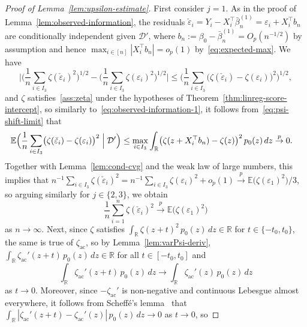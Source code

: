 \documentclass[a4paper]{article}
\newcommand{\R}{\mathbb{R}}
\newcommand{\E}{\mathbb{E}}
\newcommand{\cvp}{\overset{p}{\to}}
\theoremstyle{definition}
\begin{document}
\begin{proof}[Proof of Lemma~\ref{lem:upsilon-estimate}]
First consider $j = 1$. As in the proof of Lemma~\ref{lem:observed-information}, the residuals $\check{\varepsilon}_i = Y_i - X_i^\top\bar{\beta}_n^{(1)} = \varepsilon_i + X_i^\top b_n$ are conditionally independent given $\mathcal{D}'$, where $b_n := \beta_0 - \bar{\beta}_n^{(1)} = O_p(n^{-1/2})$ by assumption and hence $\max_{i \in [n]} |X_i^\top b_n| = o_p(1)$ by~\eqref{eq:expected-max}. We have
\[
\biggl|\biggl(\frac{1}{n}\sum_{i \in I_3} \zeta(\check{\varepsilon}_i)^2\biggr)^{1/2} - \biggl(\frac{1}{n}\sum_{i \in I_3} \zeta(\varepsilon_i)^2\biggr)^{1/2}\biggr| \leq \biggl(\frac{1}{n}\sum_{i \in I_3} \bigl(\zeta(\check{\varepsilon}_i) - \zeta(\varepsilon_i)\bigr)^2\biggr)^{1/2},
\]
and $\zeta$ satisfies~\ref{ass:zeta} under the hypotheses of Theorem~\ref{thm:linreg-score-intercept}, so similarly to~\eqref{eq:observed-information-1}, it follows from~\eqref{eq:psi-shift-limit} that
\begin{align*}
\E\Bigl(\frac{1}{n}\sum_{i \in I_3} \bigl(\zeta(\check{\varepsilon}_i) - \zeta(\varepsilon_i)\bigr)^2 \Bigm| \mathcal{D}'\Bigr) &\leq \max_{i \in I_3} \int_\R\bigl(\zeta(z + X_i^\top b_n) - \zeta(z)\bigr)^2\,p_0(z)\,dz \cvp 0.
\end{align*}
Together with Lemma~\ref{lem:cond-cvg} and the weak law of large numbers, this implies that $n^{-1}\sum_{i \in I_3} \zeta(\check{\varepsilon}_i)^2 = n^{-1}\sum_{i \in I_3} \zeta(\varepsilon_i)^2 + o_p(1) \cvp \E\bigl(\zeta(\varepsilon_1)^2\bigr)/3$, so arguing similarly for $j \in \{2,3\}$, we obtain
\begin{equation}
\label{eq:zeta-squared-avg}
\frac{1}{n}\sum_{i=1}^n \zeta(\check{\varepsilon}_i)^2 \cvp \E\bigl(\zeta(\varepsilon_1)^2\bigr)
\end{equation}
as $n \to \infty$. Next, since $\zeta$ satisfies $\int_\R \zeta(z + t)^2\,p_0(z)\,dz \in \R$ for $t \in \{-t_0,t_0\}$, the same is true of $\zeta_{\mathrm{ac}}$, so by Lemma~\ref{lem:varPsi-deriv}, $\int_\R \zeta_{\mathrm{ac}}'(z + t)\,p_0(z)\,dz \in \R$ for all $t \in [-t_0,t_0]$ and
\[
\int_\R \zeta_{\mathrm{ac}}'(z + t)\,p_0(z)\,dz 
\to \int_\R \zeta_{\mathrm{ac}}'(z)\,p_0(z)\,dz
\]
as $t \to 0$. Moreover, since $-\zeta_{\mathrm{ac}}'$ is non-negative and continuous Lebesgue almost everywhere, it follows from Scheff\'e's lemma~\citep[e.g.][Lemma~2.29]{vdV1998asymptotic} that $\int_\R |\zeta_{\mathrm{ac}}'(z + t) - \zeta_{\mathrm{ac}}'(z)|\,p_0(z)\,dz \to 0$ as $t \to 0$, so

\end{proof}
\end{document}
